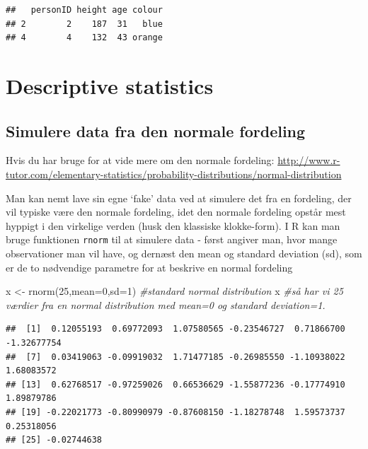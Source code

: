\documentclass[
]{book}
\newenvironment{Shaded}{\begin{snugshade}}{\end{snugshade}}
\newcommand{\AttributeTok}[1]{\textcolor[rgb]{0.77,0.63,0.00}{#1}}
\newcommand{\CommentTok}[1]{\textcolor[rgb]{0.56,0.35,0.01}{\textit{#1}}}
\newcommand{\DecValTok}[1]{\textcolor[rgb]{0.00,0.00,0.81}{#1}}
\newcommand{\FunctionTok}[1]{\textcolor[rgb]{0.00,0.00,0.00}{#1}}
\newcommand{\NormalTok}[1]{#1}
\newcommand{\OtherTok}[1]{\textcolor[rgb]{0.56,0.35,0.01}{#1}}
\begin{document}
\begin{verbatim}
##   personID height age colour
## 2        2    187  31   blue
## 4        4    132  43 orange
\end{verbatim}

\hypertarget{descriptive-statistics}{%
\section{Descriptive statistics}\label{descriptive-statistics}}

\hypertarget{simulere-data-fra-den-normale-fordeling}{%
\subsection{Simulere data fra den normale fordeling}\label{simulere-data-fra-den-normale-fordeling}}

Hvis du har bruge for at vide mere om den normale fordeling: \url{http://www.r-tutor.com/elementary-statistics/probability-distributions/normal-distribution}

Man kan nemt lave sin egne `fake' data ved at simulere det fra en fordeling, der vil typiske være den normale fordeling, idet den normale fordeling opstår mest hyppigt i den virkelige verden (husk den klassiske klokke-form). I R kan man bruge funktionen \texttt{rnorm} til at simulere data - først angiver man, hvor mange observationer man vil have, og dernæst den mean og standard deviation (sd), som er de to nødvendige parametre for at beskrive en normal fordeling

\begin{Shaded}
\begin{Highlighting}[]
\NormalTok{x }\OtherTok{\textless{}{-}} \FunctionTok{rnorm}\NormalTok{(}\DecValTok{25}\NormalTok{,}\AttributeTok{mean=}\DecValTok{0}\NormalTok{,}\AttributeTok{sd=}\DecValTok{1}\NormalTok{) }\CommentTok{\#standard normal distribution}
\NormalTok{x }\CommentTok{\#så har vi 25 værdier fra en normal distribution med mean=0 og standard deviation=1.}
\end{Highlighting}
\end{Shaded}

\begin{verbatim}
##  [1]  0.12055193  0.69772093  1.07580565 -0.23546727  0.71866700 -1.32677754
##  [7]  0.03419063 -0.09919032  1.71477185 -0.26985550 -1.10938022  1.68083572
## [13]  0.62768517 -0.97259026  0.66536629 -1.55877236 -0.17774910  1.89879786
## [19] -0.22021773 -0.80990979 -0.87608150 -1.18278748  1.59573737  0.25318056
## [25] -0.02744638
\end{verbatim}
\end{document}
